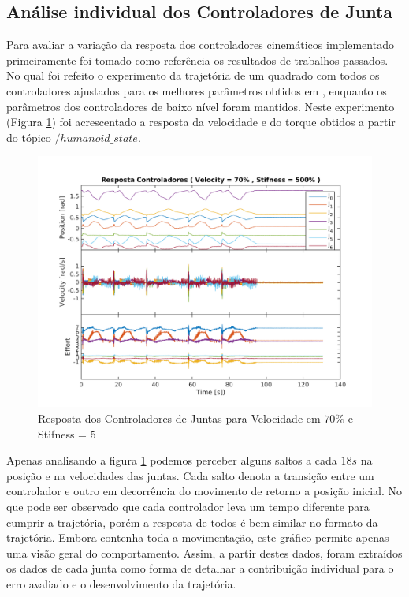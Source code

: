 \subsection{Análise individual dos Controladores de Junta}

Para avaliar a variação da resposta dos controladores cinemáticos implementado primeiramente foi tomado como referência os resultados de trabalhos passados. No qual foi refeito o experimento da trajetória de um quadrado com todos os controladores ajustados para os melhores parâmetros obtidos em \cite{marcosps2016}, enquanto os parâmetros dos controladores de baixo nível foram mantidos. Neste experimento (Figura \ref{fig:squareStiffMarcos}) foi acrescentado a resposta da velocidade e do torque obtidos a partir do tópico $/humanoid\_state$.

\begin{figure}[H]
    \centering
    \includegraphics[width=0.8\linewidth,trim={2cm 1cm 2cm 0.5cm}]{tex/figs/squareStifff4stateEvalv70s500.png}
    \caption{Resposta dos Controladores de Juntas para Velocidade em $70\%$ e Stifness = $5$ }
    \label{fig:squareStiffMarcos}
\end{figure}

Apenas analisando a figura \ref{fig:squareStiffMarcos} podemos perceber alguns saltos a cada $18s$ na posição e na velocidades das juntas. Cada salto denota a transição entre um controlador e outro em decorrência do movimento de retorno a posição inicial. No que pode ser observado que cada controlador leva um tempo diferente para cumprir a trajetória, porém a resposta de todos é bem similar no formato da trajetória. Embora contenha toda a movimentação, este gráfico permite apenas uma visão geral do comportamento. Assim, a partir destes dados, foram extraídos os dados de cada junta como forma de detalhar a contribuição individual para o erro avaliado e o desenvolvimento da trajetória.

